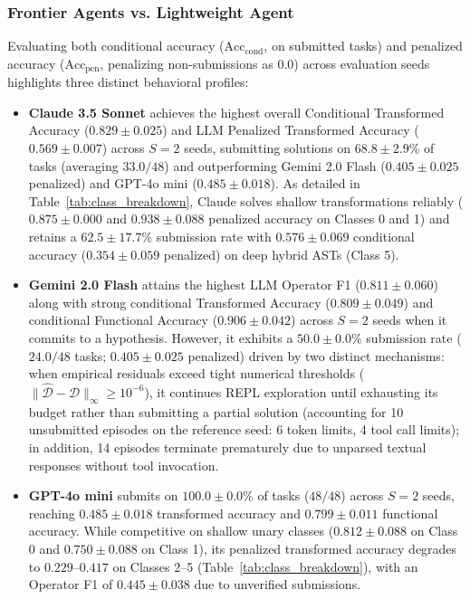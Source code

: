 \documentclass[sigconf]{acmart}
\begin{document}
\subsubsection{Frontier Agents vs. Lightweight Agent}
Evaluating both conditional accuracy ($\text{Acc}_{\text{cond}}$, on submitted tasks) and penalized accuracy ($\text{Acc}_{\text{pen}}$, penalizing non-submissions as 0.0) across evaluation seeds highlights three distinct behavioral profiles:
\begin{itemize}
    \item \textbf{Claude 3.5 Sonnet} achieves the highest overall Conditional Transformed Accuracy (\textbf{$0.829 \pm 0.025$}) and LLM Penalized Transformed Accuracy (\textbf{$0.569 \pm 0.007$}) across $S=2$ seeds, submitting solutions on $68.8 \pm 2.9\%$ of tasks (averaging $33.0/48$) and outperforming Gemini 2.0 Flash ($0.405 \pm 0.025$ penalized) and GPT-4o mini ($0.485 \pm 0.018$). As detailed in Table~\ref{tab:class_breakdown}, Claude solves shallow transformations reliably ($0.875 \pm 0.000$ and $0.938 \pm 0.088$ penalized accuracy on Classes 0 and 1) and retains a $62.5 \pm 17.7\%$ submission rate with $0.576 \pm 0.069$ conditional accuracy ($0.354 \pm 0.059$ penalized) on deep hybrid ASTs (Class 5).
    \item \textbf{Gemini 2.0 Flash} attains the highest LLM Operator F1 (\textbf{$0.811 \pm 0.060$}) along with strong conditional Transformed Accuracy ($0.809 \pm 0.049$) and conditional Functional Accuracy ($0.906 \pm 0.042$) across $S=2$ seeds when it commits to a hypothesis. However, it exhibits a $50.0 \pm 0.0\%$ submission rate ($24.0/48$ tasks; $0.405 \pm 0.025$ penalized) driven by two distinct mechanisms: when empirical residuals exceed tight numerical thresholds ($\|\widehat{\mathcal{D}} - \mathcal{D}\|_\infty \ge 10^{-6}$), it continues REPL exploration until exhausting its budget rather than submitting a partial solution (accounting for 10 unsubmitted episodes on the reference seed: 6 token limits, 4 tool call limits); in addition, 14 episodes terminate prematurely due to unparsed textual responses without tool invocation.
    \item \textbf{GPT-4o mini} submits on $100.0 \pm 0.0\%$ of tasks ($48/48$) across $S=2$ seeds, reaching $0.485 \pm 0.018$ transformed accuracy and $0.799 \pm 0.011$ functional accuracy. While competitive on shallow unary classes ($0.812 \pm 0.088$ on Class 0 and $0.750 \pm 0.088$ on Class 1), its penalized transformed accuracy degrades to $0.229$--$0.417$ on Classes 2--5 (Table~\ref{tab:class_breakdown}), with an Operator F1 of $0.445 \pm 0.038$ due to unverified submissions.
\end{itemize}
\end{document}
